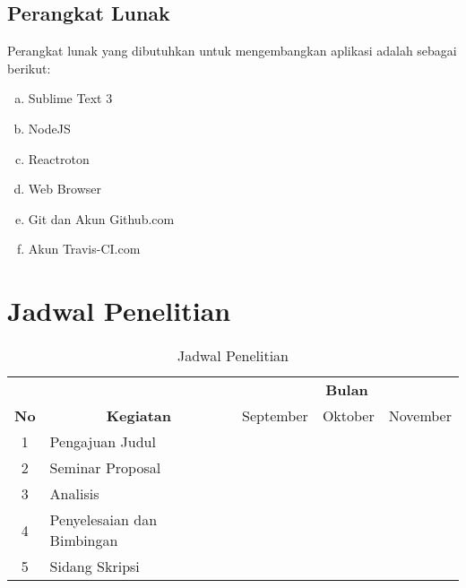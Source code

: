 \begin{spacing}{2}
	\subsection{Perangkat Lunak}
		Perangkat lunak yang dibutuhkan untuk mengembangkan aplikasi adalah sebagai berikut:

		\vspace{-0.5cm}

		\begin{enumerate}[a.]
		\itemsep0em
			\item Sublime Text 3
			\item NodeJS
			\item Reactroton
			\item Web Browser
			\item Git dan Akun Github.com
			\item Akun Travis-CI.com
		\end{enumerate}

\section{Jadwal Penelitian}
	\begin{table}[H]
  \centering
  \caption{Jadwal Penelitian}
  \label{my-label}
  \begin{tabular}{|c|l|l|l|l|}
  \hline
                                & \multicolumn{1}{c|}{}                                    & \multicolumn{3}{c|}{\textbf{Bulan}}                                            \\ \cline{3-5} 
  \multirow{-2}{*}{\textbf{No}} & \multicolumn{1}{c|}{\multirow{-2}{*}{\textbf{Kegiatan}}} & September                & Oktober                  & November                 \\ \hline
  1                             & Pengajuan Judul                                          & \cellcolor[HTML]{656565} &                          &                          \\ \hline
  2                             & Seminar Proposal                                         &                          & \cellcolor[HTML]{656565} &                          \\ \hline
  3                             & Analisis                                                 &                          & \cellcolor[HTML]{656565} &                          \\ \hline
  4                             & Penyelesaian dan Bimbingan                               &                          & \cellcolor[HTML]{656565} &                          \\ \hline
  5                             & Sidang Skripsi                                           &                          &                          & \cellcolor[HTML]{656565} \\ \hline
  \end{tabular}
  \end{table}
\end{spacing}
\begin{comment}

\end{comment}
